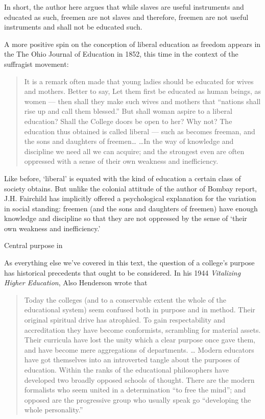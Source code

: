 In short, the author here argues that while slaves are useful instruments and educated as such, freemen are not slaves and therefore, freemen are not useful instruments and shall not be educated such. 

A more positive spin on the conception of liberal education as freedom appears in the The Ohio Journal of Education in 1852, this time in the context of the suffragist movement:

\begin{quote}

It is a remark often made that young ladies should be educated for wives and mothers. Better to say, Let them first be educated as human beings, as women --- then shall they make such wives and mothers that ``nations shall rise up and call them blessed.''
But shall woman aspire to a liberal education? Shall the College doors be open to her? Why not? The education thus obtained is called liberal --- such as becomes freeman, and the sons and daughters of freemen{\ldots} {\ldots}In the way of knowledge and discipline we need all we can acquire; and the strongest even are often oppressed with a sense of their own weakness and inefficiency. ~\citep[p. 363]{Fairchild:1852ul}
\end{quote}

Like before, `liberal' is equated with the kind of education a certain class of society obtains. But unlike the colonial attitude of the author of Bombay report, J.H. Fairchild has implicitly offered a psychological explanation for the variation in social standing: freemen (and the sons and daughters of freemen) have enough knowledge and discipline so that they are not oppressed by the sense of `their own weakness and inefficiency.' 

Central purpose in ~\citep{commission:1961ws}

As everything else we've covered in this text, the question of a college's purpose has historical precedents that ought to be considered. In his 1944 \emph{Vitalizing Higher Education}, Also Henderson wrote that 

\begin{quote}

Today the colleges (and to a conservable extent the whole of the educational system) seem confused both in purpose and in method. Their original spiritual drive has atrophied. To gain respectability and accreditation they have become conformists, scrambling for material assets. Their curricula have lost the unity which a clear purpose once gave them, and have become mere aggregations of departments. {\ldots} Modern educators have got themselves into an introverted tangle about the purposes of education. Within the ranks of the educational philosophers have developed two broadly opposed schools of thought. There are the modern formalists who seem united in a determination ``to free the mind''; and opposed are the progressive group who usually speak go ``developing the whole personality.'' ~\citep[P. 16--17]{Henderson:1944vw}
\end{quote}


